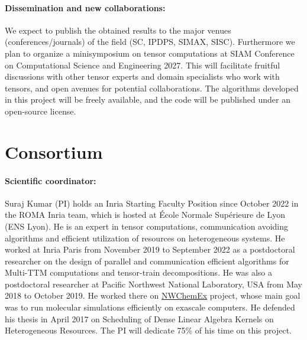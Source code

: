 \documentclass[a4paper,11pt, margin=2cm]{article}
\newcommand{\bora}[1]{{\color{magenta} \emph{#1}}}
\begin{document}
	
	\vspace*{-0.15cm}\paragraph{Dissemination and new collaborations:} We expect to publish the obtained results to the major venues (conferences/journals) of the field (SC, IPDPS, SIMAX, SISC). Furthermore we plan to organize a minisymposium on tensor computations at SIAM Conference on Computational Science and Engineering 2027. This will facilitate fruitful discussions with other tensor experts and domain specialists who work with tensors, and open avenues for potential collaborations.
	The algorithms developed in this project will be freely available, and the code will be published under an open-source license.
	
	
	\vspace*{-0.25cm}\section{Consortium}
	
	
	\vspace*{-0.15cm}\paragraph{Scientific coordinator:}Suraj Kumar (PI) holds an Inria Starting Faculty Position since October 2022 in the ROMA Inria team, which is hosted at École Normale Supérieure de Lyon (ENS Lyon). He is an expert in tensor computations, communication avoiding algorithms and efficient utilization of resources on heterogeneous systems. He worked at Inria Paris from November 2019 to September 2022 as a postdoctoral researcher on the design of parallel and communication efficient algorithms for Multi-TTM computations and tensor-train decompositions. He was also a postdoctoral researcher at Pacific Northwest National Laboratory, USA from May 2018 to October 2019. He worked there on \href{https://www.exascaleproject.org/research-project/nwchemex}{NWChemEx} project, whose main goal was to run molecular simulations efficiently on exascale computers. He defended his thesis in April 2017 on Scheduling of Dense Linear Algebra Kernels on Heterogeneous Resources. 
	The PI will dedicate 75\% of his time on this project.
	
\end{document}
